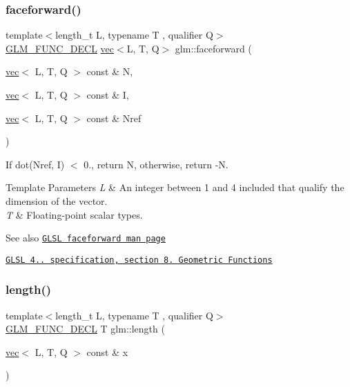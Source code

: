 \subsubsection{\texorpdfstring{faceforward()}{faceforward()}}
{\footnotesize\ttfamily template$<$length\+\_\+t L, typename T , qualifier Q$>$ \\
\hyperlink{setup_8hpp_ab2d052de21a70539923e9bcbf6e83a51}{G\+L\+M\+\_\+\+F\+U\+N\+C\+\_\+\+D\+E\+CL} \hyperlink{structglm_1_1vec}{vec}$<$L, T, Q$>$ glm\+::faceforward (\begin{DoxyParamCaption}\item[{\hyperlink{structglm_1_1vec}{vec}$<$ L, T, Q $>$ const \&}]{N,  }\item[{\hyperlink{structglm_1_1vec}{vec}$<$ L, T, Q $>$ const \&}]{I,  }\item[{\hyperlink{structglm_1_1vec}{vec}$<$ L, T, Q $>$ const \&}]{Nref }\end{DoxyParamCaption})}

If dot(\+Nref, I) $<$ 0., return N, otherwise, return -\/N.


\begin{DoxyTemplParams}{Template Parameters}
{\em L} & An integer between 1 and 4 included that qualify the dimension of the vector. \\
\hline
{\em T} & Floating-\/point scalar types.\\
\hline
\end{DoxyTemplParams}
\begin{DoxySeeAlso}{See also}
\href{http://www.opengl.org/sdk/docs/manglsl/xhtml/faceforward.xml}{\tt G\+L\+SL faceforward man page} 

\href{http://www.opengl.org/registry/doc/GLSLangSpec.4.20.8.pdf}{\tt G\+L\+SL 4.. specification, section 8. Geometric Functions} 
\end{DoxySeeAlso}
\mbox{\label{group__core__func__geometric_ga0cdabbb000834d994a1d6dc56f8f5263}} 
\subsubsection{\texorpdfstring{length()}{length()}}
{\footnotesize\ttfamily template$<$length\+\_\+t L, typename T , qualifier Q$>$ \\
\hyperlink{setup_8hpp_ab2d052de21a70539923e9bcbf6e83a51}{G\+L\+M\+\_\+\+F\+U\+N\+C\+\_\+\+D\+E\+CL} T glm\+::length (\begin{DoxyParamCaption}\item[{\hyperlink{structglm_1_1vec}{vec}$<$ L, T, Q $>$ const \&}]{x }\end{DoxyParamCaption})}

